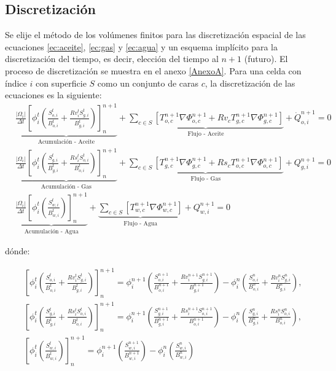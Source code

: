 \subsection{Discretización}

Se elije el método de los volúmenes finitos para las discretización espacial de las ecuaciones \ref{ec:aceite}, \ref{ec:gas} y \ref{ec:agua} y un esquema implícito para la discretización del tiempo, es decir, elección del tiempo al $n+1$ (futuro). El proceso de discretización se muestra en el anexo \ref{AnexoA}. Para una celda con índice $i$ con superficie $S$ como un conjunto de caras $c$, la discretización de las ecuaciones es la siguiente:
\begin{align}
\label{ec:aceiteDiscretizacion}&\underbrace{\frac{|\Omega_{i}|}{\Delta t}\left[ \phi^{t}_{i} \left( \frac{S_{o,i}^{t}}{B_{o,i}^{t}} + \frac{Rv_{i}^{t}S_{g,i}^{t}}{B_{g,i}^{t}}\right)\right]^{n+1}_{n}}_{\text{Acumulación - Aceite}} + 
\underbrace{\sum_{c \in S}\left[ T^{n+1}_{o,c} \nabla{\Phi_{o,c}^{n+1}} + Rv_{c}T^{n+1}_{g,c} \nabla{\Phi_{g,c}^{n+1}} \right] }_{\text{Flujo - Aceite}}+ \dot{Q}_{o,i}^{n+1} = 0 \\
\label{ec:gasDiscretizacion}&\underbrace{\frac{|\Omega_{i}|}{\Delta t}\left[ \phi^{t}_{i} \left( \frac{S_{g,i}^{t}}{B_{g,i}^{t}} + \frac{Rs_{i}^{t}S_{o,i}^{t}}{B_{o,i}^{t}}\right)\right]^{n+1}_{n}}_{\text{Acumulación - Gas}} + 
\underbrace{\sum_{c \in S}\left[ T^{n+1}_{g,c}\nabla{\Phi_{g,c}^{n+1} + Rs_{c}T^{n+1}_{o,c} \nabla{\Phi_{o,c}^{n+1}}} \right] }_{\text{Flujo - Gas}}+ Q_{g,i}^{n+1} = 0 \\
\label{ec:aguaDiscretizacion}&\underbrace{\frac{|\Omega_{i}|}{\Delta t}\left[ \phi^{t}_{i} \left( \frac{S_{w,i}^{t}}{B_{w,i}^{t}}\right)\right]^{n+1}_{n}}_{\text{Acumulación - Agua}}
+ 
\underbrace{\sum_{c \in S}\left[ T^{n+1}_{w,c}\nabla{\Phi_{w,c}^{n+1}} \right]}_{\text{Flujo - Agua}} + Q_{w,i}^{n+1} = 0 
\end{align}

dónde:

\begin{align*}
	&\left[ \phi^{t}_{i} \left( \frac{S_{o,i}^{t}}{B_{o,i}^{t}} + \frac{Rv_{i}^{t}S_{g,i}^{t}}{B_{g,i}^{t}}\right)\right]^{n+1}_{n} = 
	\phi^{n+1}_{i} \left( \frac{S_{o,i}^{n+1}}{B_{o,i}^{n+1}} + \frac{Rv_{i}^{n+1}S_{g,i}^{n+1}}{B_{g,i}^{n+1}}\right) - \phi^{n}_{i} \left( \frac{S_{o,i}^{n}}{B_{o,i}^{n}} + \frac{Rv_{i}^{n}S_{g,i}^{n}}{B_{g,i}^{n}}\right),\\
	&\left[ \phi^{t}_{i} \left( \frac{S_{g,i}^{t}}{B_{g,i}^{t}} + \frac{Rs_{i}^{t}S_{o,i}^{t}}{B_{o,i}^{t}}\right)\right]^{n+1}_{n} = 
	\phi^{n+1}_{i} \left( \frac{S_{g,i}^{n+1}}{B_{g,i}^{n+1}} + \frac{Rs_{i}^{n+1}S_{o,i}^{n+1}}{B_{o,i}^{n+1}}\right) - \phi^{n}_{i} \left( \frac{S_{g,i}^{n}}{B_{g,i}^{n}} + \frac{Rs_{i}^{n}S_{o,i}^{n}}{B_{o,i}^{n}}\right),\\
	&\left[ \phi^{t}_{i} \left( \frac{S_{w,i}^{t}}{B_{w,i}^{t}}\right)\right]^{n+1}_{n} = 
	\phi^{n+1}_{i} \left( \frac{S_{w,i}^{n+1}}{B_{w,i}^{n+1}}\right) - \phi^{n}_{i} \left( \frac{S_{w,i}^{n}}{B_{w,i}^{n}}\right)
\end{align*}

